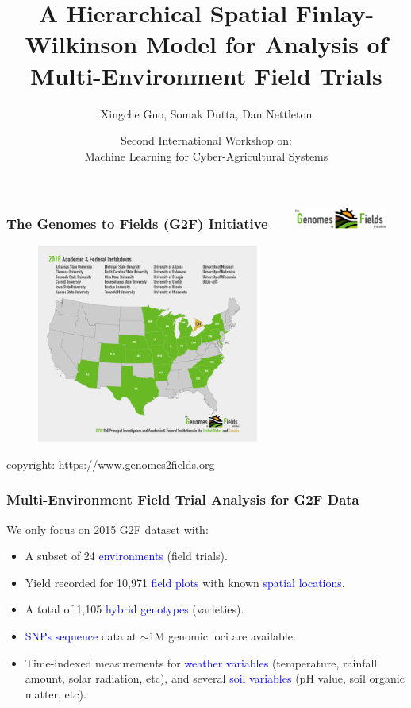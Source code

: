 \documentclass{beamer}
\title[Hierarchical Spatial FW Model for MET]{A Hierarchical Spatial Finlay-Wilkinson Model for Analysis of Multi-Environment Field Trials}
\author[Guo, X., Dutta, S., Nettleton, D.]{Xingche Guo, Somak Dutta, Dan Nettleton}
\institute[ISU]{Dept. of Statistics, Iowa State University}
\date[MLCAS]{Second International Workshop on: \\ Machine Learning for Cyber-Agricultural Systems}
\begin{document}
\renewcommand{\inserttotalframenumber}{20}
\begin{frame}
\titlepage
\end{frame}




\begin{frame}
	\frametitle{The Genomes to Fields (G2F) Initiative \ \ \   \includegraphics[width=30mm]{g2f_logo} }
	\begin{figure}[H]
		\centering
		\includegraphics[width = 0.65\textwidth]{g2f_demo.png}
	\end{figure}	
	copyright:	\url{https://www.genomes2fields.org}
\end{frame}


\begin{frame}
	\frametitle{Multi-Environment Field Trial Analysis for G2F Data}
We only focus on 2015 G2F dataset with:  
\vspace{1.5em}
\begin{itemize}
	\item A subset of 24 \textcolor{blue}{environments} (field trials).
	\item Yield recorded for 10,971 \textcolor{blue}{field plots} with known \textcolor{blue}{spatial locations}.
	\item A total of 1,105 \textcolor{blue}{hybrid genotypes} (varieties).  
	\item \textcolor{blue}{SNPs sequence} data at $\sim$1M genomic loci are available.
	\item  Time-indexed measurements for \textcolor{blue}{weather variables} (temperature, rainfall amount, solar radiation, etc), and several \textcolor{blue}{soil variables} (pH value, soil organic matter, etc).
\end{itemize}
\end{frame}
\end{document}
